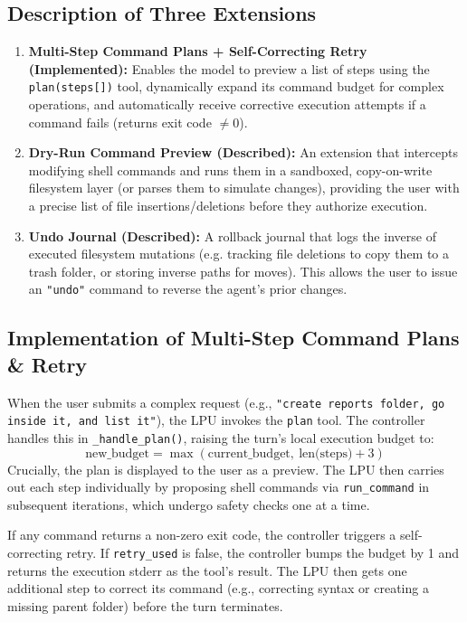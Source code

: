 \documentclass[11pt,a4paper]{article}
\begin{document}
\subsection{Description of Three Extensions}
\begin{enumerate}
    \item \textbf{Multi-Step Command Plans + Self-Correcting Retry (Implemented):} Enables the model to preview a list of steps using the \texttt{plan(steps[])} tool, dynamically expand its command budget for complex operations, and automatically receive corrective execution attempts if a command fails (returns exit code $\neq 0$).
    \item \textbf{Dry-Run Command Preview (Described):} An extension that intercepts modifying shell commands and runs them in a sandboxed, copy-on-write filesystem layer (or parses them to simulate changes), providing the user with a precise list of file insertions/deletions before they authorize execution.
    \item \textbf{Undo Journal (Described):} A rollback journal that logs the inverse of executed filesystem mutations (e.g. tracking file deletions to copy them to a trash folder, or storing inverse paths for moves). This allows the user to issue an \texttt{"undo"} command to reverse the agent's prior changes.
\end{enumerate}

\subsection{Implementation of Multi-Step Command Plans \& Retry}
When the user submits a complex request (e.g., \texttt{"create reports folder, go inside it, and list it"}), the LPU invokes the \texttt{plan} tool. The controller handles this in \texttt{\_handle\_plan()}, raising the turn's local execution budget to:
$$\text{new\_budget} = \max(\text{current\_budget},\ \text{len(steps)} + 3)$$
Crucially, the plan is displayed to the user as a preview. The LPU then carries out each step individually by proposing shell commands via \texttt{run\_command} in subsequent iterations, which undergo safety checks one at a time.

If any command returns a non-zero exit code, the controller triggers a self-correcting retry. If \texttt{retry\_used} is false, the controller bumps the budget by 1 and returns the execution stderr as the tool's result. The LPU then gets one additional step to correct its command (e.g., correcting syntax or creating a missing parent folder) before the turn terminates.
\end{document}
